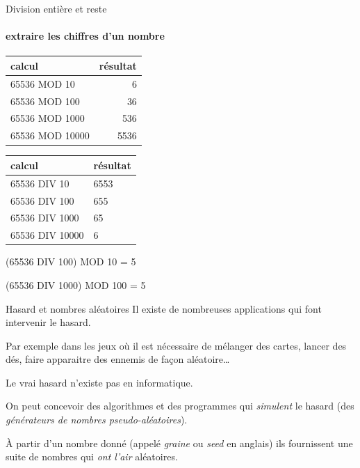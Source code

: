 \begin{hideedit}
\begin{frame}[fragile]{Division entière et reste}
\framesubtitle{extraire les chiffres d'un nombre}
  \begin{center}
  \begin{tabular}{|l|r|}\hline
    \rowcolor{black!20}
    calcul & résultat \\
    \hline
    65536 MOD 10 & 6 \\
    65536 MOD 100 & 36 \\
    65536 MOD 1000 & 536 \\
    65536 MOD 10000 & 5536 \\
    \hline
  \end{tabular}
  \qquad
  \begin{tabular}{|l|l|}\hline
    \rowcolor{black!20}
    calcul & résultat \\
    \hline
    65536 DIV 10 & 6553 \\
    65536 DIV 100 & 655 \\
    65536 DIV 1000 & 65 \\
    65536 DIV 10000 & 6 \\
    \hline
  \end{tabular}
  \end{center}

  \begin{example}
    \pause
    (65536 DIV 100) MOD 10 = 5
  \end{example}

  \pause
  \begin{example}
    \pause
    (65536 DIV 1000) MOD 100 = 5  \end{example}
\end{frame}

\begin{frame}{Hasard et nombres aléatoires}
  Il existe de nombreuses applications qui font intervenir le hasard.

  Par exemple dans les jeux où il est nécessaire de mélanger des
  cartes, lancer des dés, faire apparaitre des ennemis de façon
  aléatoire\dots

  Le vrai hasard \og n’existe pas \fg en informatique.

  On peut concevoir des algorithmes et des programmes
  qui \emph{simulent} le hasard (des \emph{générateurs de nombres
  pseudo-aléatoires}).

  À partir d’un nombre donné
  (appelé \emph{graine} ou \emph{seed} en anglais)
  ils fournissent une suite de nombres qui \emph{ont l’air}
  aléatoires.
\end{frame}


\end{hideedit}
